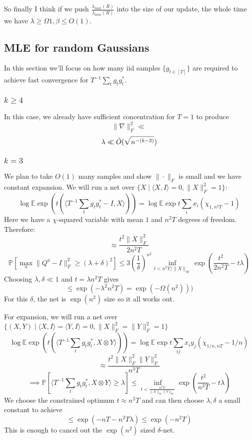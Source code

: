 \documentclass{article}
\newcommand{\E}{\mathbb{E}}
\renewcommand{\Pr}{\mathbb{P}}
\begin{document}
So finally I think if we push $\frac{\lambda_{max}(R)}{\lambda_{min}(R)}$ into the size of our update, the whole time we have $\lambda \geq \Omega 1, \beta \leq O(1)$. 


\subsection{MLE for random Gaussians}
In this section we'll focus on how many iid samples $\{g_{t \in [T]}\} $ are required to achieve fast convergence for $T^{-1} \sum_{t} g_{t} g_{t}^{*}$. 

\subsubsection{$k \geq 4$}
In this case, we already have sufficient concentration for $T=1$ to produce
\[ \|\nabla\|_{F}^{2} \ll    \]
\[ \lambda \ll \Tilde{O}(\sqrt{n^{-(k-2)}})   \]

\subsubsection{$k=3$}
We plan to take $O(1)$ many samples and show $\|\cdot\|_{F}$ is small and we have constant expansion. We will run a net over $\{X \mid \langle X, I \rangle = 0, \|X\|_{F}^{2} = 1\}$:
\[ \log \E \exp ( t (\langle T^{-1} \sum_{t} g_{t} g_{t}^{*} - I, X \rangle) ) = \log \E \exp t \sum_{i} x_{i} (\chi_{1,n^{2}T} - 1)  \]
Here we have a $\chi$-squared variable with mean $1$ and $n^{2} T$ degrees of freedom. Therefore:
\[ \approx \frac{t^{2} \|X\|_{F}^{2}}{2 n^{2} T}  \]
\[ \Pr[\max_{a} \|Q^{a} - I\|_{F}^{2} \geq (\lambda+\delta)^{2}] \leq 3 \left(\frac{1}{\delta} \right)^{n^{2}} \inf_{t < n^{2} T/\|X\|_{op}} \exp \left( \frac{t^{2}}{2 n^{2} T} - t \lambda \right) \]
Choosing $\lambda, \delta \ll 1$ and $t = \lambda n^{2} T$ gives 
\[ \leq \exp ( - \lambda^{2} n^{2} T ) = \exp ( - \Omega(n^{2})  )   )  \]
For this $\delta$, the net is $\exp(n^{2})$ size so it all works out. 

For expansion, we will run a net over $\{(X,Y) \mid \langle X, I \rangle = \langle Y, I \rangle = 0, \|X\|_{F}^{2} = \|Y\|_{F}^{2} = 1\}$
\[ \log \E \exp ( t (\langle T^{-1} \sum_{t} g_{t} g_{t}^{*}, X \otimes Y \rangle) ) = \log \E \exp t \sum_{ij} x_{i} y_{j} (\chi_{1/n, nT} - 1/n) \]
\[ \approx \frac{t^{2} \|X\|_{F}^{2} \|Y\|_{F}^{2}}{n^{3} T}  \]
\[ \implies \Pr [ \langle T^{-1} \sum_{t} g_{t} g_{t}^{*}, X \otimes Y \rangle \geq \lambda ] \leq \inf_{t < \frac{n^{2} T}{\|X\|_{op} \|Y\|_{op}}} \exp \left( \frac{t^{2}}{n^{3} T} - t \lambda   \right)   \]
We choose the constrained optimum $t \approx n^{2} T$ and can then choose $\lambda, \delta$ a small constant to achieve 
\[ \leq \exp ( - n T - n^{2} T \lambda ) \leq \exp ( - n^{2} T )  \]
This is enough to cancel out the $\exp(n^{2})$ sized $\delta$-net. 
\end{document}
